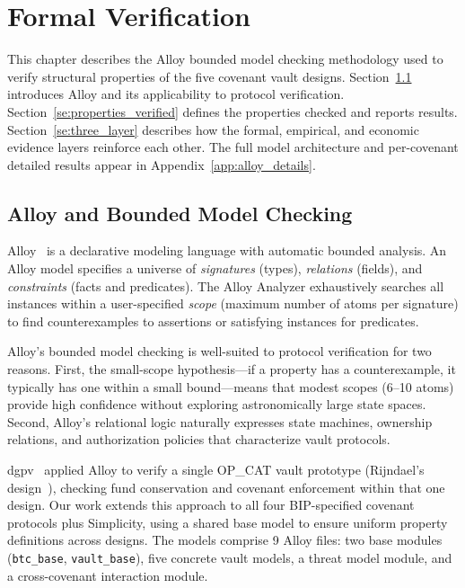 \chapter{Formal Verification} \label{ch:verification}

This chapter describes the Alloy bounded model checking methodology used to verify
structural properties of the five covenant vault designs. Section~\ref{se:alloy_bg}
introduces Alloy and its applicability to protocol verification.
Section~\ref{se:properties_verified} defines the properties checked and reports
results. Section~\ref{se:three_layer} describes how the formal, empirical, and
economic evidence layers reinforce each other. The full model architecture and
per-covenant detailed results appear in Appendix~\ref{app:alloy_details}.

\section{Alloy and Bounded Model Checking} \label{se:alloy_bg}

Alloy~\cite{Jackson12} is a declarative modeling language with automatic bounded
analysis. An Alloy model specifies a universe of \emph{signatures} (types),
\emph{relations} (fields), and \emph{constraints} (facts and predicates). The Alloy
Analyzer exhaustively searches all instances within a user-specified \emph{scope}
(maximum number of atoms per signature) to find counterexamples to assertions or
satisfying instances for predicates.

Alloy's bounded model checking is well-suited to protocol verification for two reasons.
First, the small-scope hypothesis---if a property has a counterexample, it typically
has one within a small bound---means that modest scopes (6--10 atoms) provide high
confidence without exploring astronomically large state spaces. Second, Alloy's
relational logic naturally expresses state machines, ownership relations, and
authorization policies that characterize vault protocols.

dgpv~\cite{dgpv24} applied Alloy to verify a single OP\_CAT vault prototype
(Rijndael's design~\cite{Rij24}), checking fund conservation and covenant enforcement
within that one design. Our work extends this approach to all four BIP-specified
covenant protocols plus Simplicity, using a shared base model to ensure uniform
property definitions across designs. The models comprise 9 Alloy files: two base
modules (\texttt{btc\_base}, \texttt{vault\_base}), five concrete vault models,
a threat model module, and a cross-covenant interaction module.

